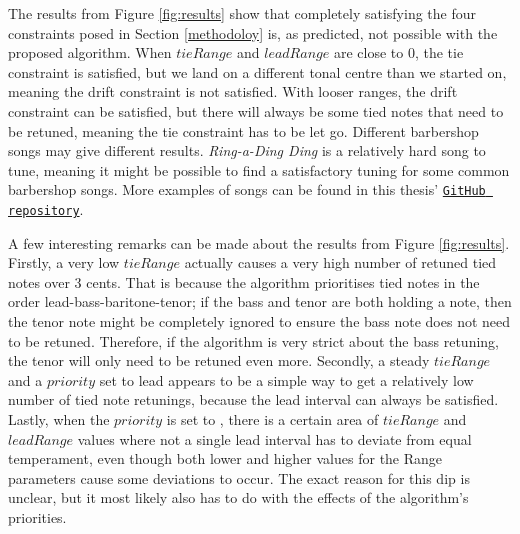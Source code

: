 \documentclass[a4paper]{article}
\begin{document}
The results from Figure \ref{fig:results} show that completely satisfying the four constraints posed in Section \ref{methodoloy} is, as predicted, not possible with the proposed algorithm. When $\mathit{tieRange}$ and $\mathit{leadRange}$ are close to 0, the tie constraint is satisfied, but we land on a different tonal centre than we started on, meaning the drift constraint is not satisfied. With looser ranges, the drift constraint can be satisfied, but there will always be some tied notes that need to be retuned, meaning the tie constraint has to be let go. Different barbershop songs may give different results. \textit{Ring-a-Ding Ding} is a relatively hard song to tune, meaning it might be possible to find a satisfactory tuning for some common barbershop songs. More examples of songs can be found in this thesis' \texttt{\href{https://github.com/teuncb/adaptivebarbershop}{GitHub repository}}.

A few interesting remarks can be made about the results from Figure \ref{fig:results}. Firstly, a very low $\mathit{tieRange}$ actually causes a very high number of retuned tied notes over 3 cents. That is because the algorithm prioritises tied notes in the order lead-bass-baritone-tenor; if the bass and tenor are both holding a note, then the tenor note might be completely ignored to ensure the bass note does not need to be retuned. Therefore, if the algorithm is very strict about the bass retuning, the tenor will only need to be retuned even more. Secondly, a steady $\mathit{tieRange}$ and a $\mathit{priority}$ set to lead appears to be a simple way to get a relatively low number of tied note retunings, because the lead interval can always be satisfied. Lastly, when the $\mathit{priority}$ is set to , there is a certain area of $\mathit{tieRange}$ and $\mathit{leadRange}$ values where not a single lead interval has to deviate from equal temperament, even though both lower and higher values for the Range parameters cause some deviations to occur. The exact reason for this dip is unclear, but it most likely also has to do with the effects of the algorithm's priorities.

\end{document}
